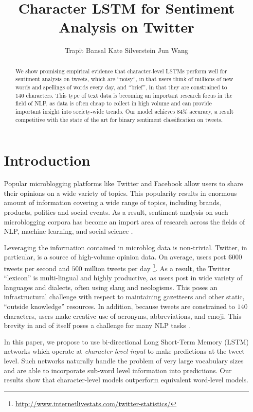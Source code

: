 \documentclass{article} %
\title{Character LSTM for Sentiment Analysis on Twitter}
\author{
Trapit Bansal
\And
Kate Silverstein
\And
Jun Wang
}
\begin{document}
\maketitle

\begin{abstract}
We show promising empirical evidence that character-level LSTMs perform well for sentiment analysis on tweets, which are ``noisy'', in that users think of millions of new words and spellings of words every day, and ``brief'', in that they are constrained to $140$ characters. This type of text data is becoming an important research focus in the field of NLP, as data is often cheap to collect in high volume and can provide important insight into society-wide trends. Our model achieves $84 \%$ accuracy, a result competitive with the state of the art for binary sentiment classification on tweets.
\end{abstract}

\section{Introduction}
Popular microblogging platforms like Twitter and Facebook allow users to share their opinions on a wide variety of topics. This popularity results in enormous amount of information covering a wide range of topics, including brands, products, politics and social events. As a result, sentiment analysis on such microblogging corpora has become an import area of research across the fields of NLP, machine learning, and social science \cite{o2010tweets, bollen2011twitter, bollen2009modeling}.

Leveraging the information contained in microblog data is non-trivial. Twitter, in particular, is a source of high-volume opinion data. On average, users post $6000$ tweets per second and $500$ million tweets per day \footnote{\url{http://www.internetlivestats.com/twitter-statistics/}}. As a result, the Twitter ``lexicon'' is multi-lingual and highly productive, as users post in wide variety of languages and dialects, often using slang and neologisms. This poses an infrastructural challenge with respect to maintaining gazetteers and other static, ``outside knowledge'' resources. In addition, because tweets are constrained to $140$ characters, users make creative use of acronyms, abbreviations, and emoji. This brevity in and of itself poses a challenge for many NLP tasks \cite{mehrotra2013improving}.

In this paper, we propose to use bi-directional Long Short-Term Memory (LSTM) \cite{hochreiter1997long} networks which operate at {\it character-level input} to make predictions at the tweet-level. Such networks naturally handle the problem of very large vocabulary sizes and are able to incorporate sub-word level information into predictions. Our results show that character-level models outperform equivalent word-level models.
\end{document}
